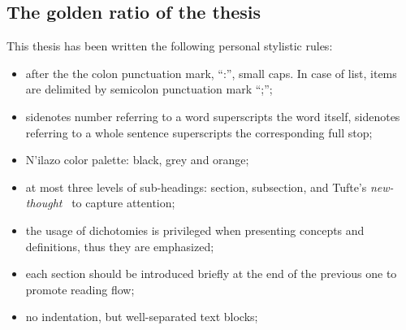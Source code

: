 \subsection{The golden ratio of the thesis}
This thesis has been written the following personal stylistic rules:
\begin{itemize}
    \item after the the colon punctuation mark, ``:'', small caps. In case of list, items are delimited by semicolon punctuation mark ``;'';
    \item sidenotes number referring to a word superscripts the word itself, sidenotes referring to a whole sentence superscripts the corresponding full stop;
    \item N'ilazo color palette: black, grey and orange;
    \item at most three levels of sub-headings: section, subsection, and Tufte's \textit{new-thought}~ to capture attention;
    \item the usage of dichotomies is privileged when presenting concepts and definitions, thus they are emphasized;
    \item each section should be introduced briefly at the end of the previous one to promote reading flow;
    \item no indentation, but well-separated text blocks;
\end{itemize}








